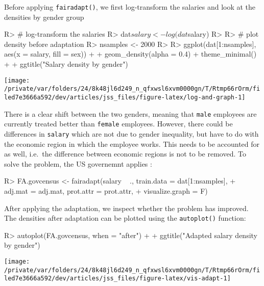 \documentclass[
  notitle]{jss}
\begin{document}
Before applying \texttt{fairadapt()}, we first log-transform the
salaries and look at the densities by gender group

\begin{CodeChunk}
\begin{CodeInput}
R> # log-transform the salaries
R> dat$salary <- log(dat$salary)
R> 
R> # plot density before adaptation
R> nsamples <- 2000
R> 
R> ggplot(dat[1:nsamples], aes(x = salary, fill = sex)) +
+   geom_density(alpha = 0.4)  + theme_minimal() +
+   ggtitle("Salary density by gender")
\end{CodeInput}


\begin{center}\texttt{[image: /private/var/folders/24/8k48jl6d249\_n\_qfxwsl6xvm0000gn/T/Rtmp66rOrm/filed7e3666a592/dev/articles/jss\_files/figure-latex/log-and-graph-1]} \end{center}

\end{CodeChunk}

There is a clear shift between the two genders, meaning that
\texttt{male} employees are currently treated better than
\texttt{female} employees. However, there could be differences in
\texttt{salary} which are not due to gender inequality, but have to do
with the economic region in which the employee works. This needs to be
accounted for as well, i.e.~the difference between economic regions is
not to be removed. To solve the problem, the US governemnt applies
:

\begin{CodeChunk}
\begin{CodeInput}
R> FA.govcensus <- fairadapt(salary ~ ., train.data = dat[1:nsamples],
+                           adj.mat = adj.mat, prot.attr = prot.attr,
+                           visualize.graph = F)
\end{CodeInput}
\end{CodeChunk}

After applying the adaptation, we inspect whether the problem has
improved. The densities after adaptation can be plotted using the
\texttt{autoplot()} function:

\begin{CodeChunk}
\begin{CodeInput}
R> autoplot(FA.govcensus, when = "after") +
+   ggtitle("Adapted salary density by gender")
\end{CodeInput}


\begin{center}\texttt{[image: /private/var/folders/24/8k48jl6d249\_n\_qfxwsl6xvm0000gn/T/Rtmp66rOrm/filed7e3666a592/dev/articles/jss\_files/figure-latex/vis-adapt-1]} \end{center}

\end{CodeChunk}
\end{document}
